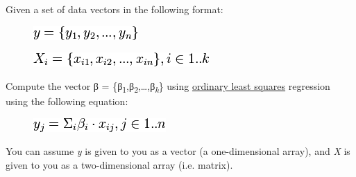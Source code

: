 Given a set of data vectors in the following format:

\begin{figure}[H]
\centering
\includegraphics[scale=.6]{graphics/14460313caad694cfeab489628009eab.png}
\end{figure}

\begin{figure}[H]
\centering
\includegraphics[scale=.6]{graphics/61a7b2eee29145e18a5583d931f62975.png}
\end{figure}

Compute the vector β =
\{β\textsubscript{1},β\textsubscript{2},\ldots{},β\textsubscript{\emph{k}}\}
using
\href{http://en.wikipedia.org/wiki/Ordinary\_least\_squares}{ordinary
least squares} regression using the following equation:

\begin{figure}[H]
\centering
\includegraphics[scale=.6]{graphics/411ee43ddd9e5b42c7ef2ddb2ec7e9fb.png}
\end{figure}

You can assume \emph{y} is given to you as a vector (a one-dimensional
array), and \emph{X} is given to you as a two-dimensional array (i.e.
matrix).

